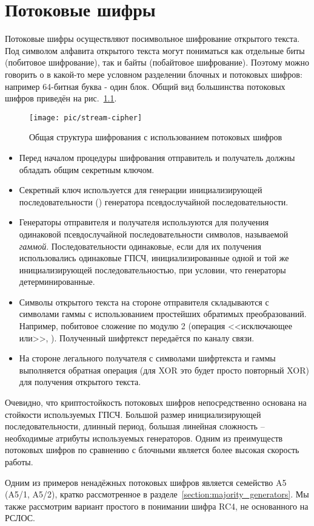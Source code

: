 \chapter{Потоковые шифры}\label{chapter-stream-ciphers}

Потоковые шифры осуществляют посимвольное шифрование открытого текста. Под символом алфавита открытого текста могут пониматься как отдельные биты (побитовое шифрование), так и байты (побайтовое шифрование). Поэтому можно говорить о в какой-то мере условном разделении блочных и потоковых шифров: например 64-битная буква - один блок. Общий вид большинства потоковых шифров приведён на рис.~\ref{fig:stream-cipher}.

\begin{figure}[hb]
	\centering
	\texttt{[image: pic/stream-cipher]}
  \caption{Общая структура шифрования с использованием потоковых шифров}
  \label{fig:stream-cipher}
\end{figure}

\begin{itemize}
	\item Перед началом процедуры шифрования отправитель и получатель должны обладать общим секретным ключом.
	\item Секретный ключ используется для генерации инициализирующей последовательности () генератора псевдослучайной последовательности.
	\item Генераторы отправителя и получателя используются для получения одинаковой псевдослучайной последовательности символов, называемой \emph{гаммой}. Последовательности одинаковые, если для их получения использовались одинаковые ГПСЧ, инициализированные одной и той же инициализирующей последовательностью, при условии, что генераторы детерминированные.
	\item Символы открытого текста на стороне отправителя складываются с символами гаммы с использованием простейших обратимых преобразований. Например, побитовое сложение по модулю 2 (операция <<исключающее или>>, ). Полученный шифртекст передаётся по каналу связи.
	\item На стороне легального получателя с символами шифртекста и гаммы выполняется обратная операция (для XOR это будет просто повторный XOR) для получения открытого текста.
\end{itemize}

Очевидно, что криптостойкость потоковых шифров непосредственно основана на стойкости используемых ГПСЧ. Большой размер инициализирующей последовательности, длинный период, большая линейная сложность -- необходимые атрибуты используемых генераторов. Одним из преимуществ потоковых шифров по сравнению с блочными является более высокая скорость работы.

Одним из примеров ненадёжных потоковых шифров является семейство A5 (A5/1, A5/2), кратко рассмотренное в разделе~\ref{section:majority_generators}. Мы также рассмотрим вариант простого в понимании шифра RC4, не основанного на РСЛОС.


